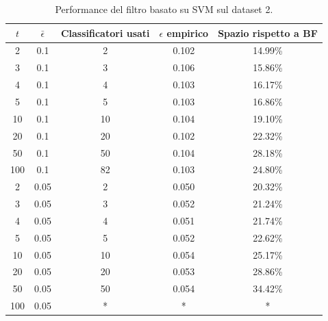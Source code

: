 \begin{table}
    \centering
    \begin{tabular}{|c|c|c|c|c|}
        \hline
        $t$ & $\bar\epsilon$ & Classificatori usati & $\epsilon$ empirico & Spazio rispetto a BF \\ 
        \hline
        2  & 0.1  & 2  & 0.102 & 14.99\% \\  
        3  & 0.1  & 3  & 0.106 & 15.86\% \\  
        4  & 0.1  & 4  & 0.103 & 16.17\% \\  
        5  & 0.1  & 5  & 0.103 & 16.86\% \\  
        10 & 0.1  & 10 & 0.104 & 19.10\% \\ 
        20 & 0.1  & 20 & 0.102 & 22.32\% \\ 
        50 & 0.1  & 50 & 0.104 & 28.18\% \\ 
        100 & 0.1 & 82 & 0.103 & 24.80\% \\  
        2  & 0.05 & 2  & 0.050 & 20.32\% \\  
        3  & 0.05 & 3  & 0.052 & 21.24\% \\  
        4  & 0.05 & 4  & 0.051 & 21.74\% \\  
        5  & 0.05 & 5  & 0.052 & 22.62\% \\  
        10 & 0.05 & 10 & 0.054 & 25.17\% \\ 
        20 & 0.05 & 20 & 0.053 & 28.86\% \\ 
        50 & 0.05 & 50 & 0.054 & 34.42\% \\ 
        100 & 0.05 & *  & *     & *      \\  
        \hline
    \end{tabular}
    \caption{Performance del filtro basato su SVM sul dataset 2.}
    \label{tab:performance-ds2-svm}
\end{table}
